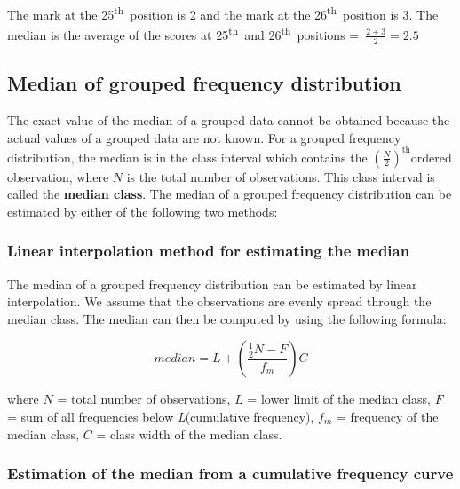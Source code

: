 \documentclass[
]{book}
\begin{document}
The mark at the 25\textsuperscript{th}~position is 2 and the mark at the 26\textsuperscript{th}~position
is 3. The median is the average of the scores at 25\textsuperscript{th}~and
26\textsuperscript{th}~positions =~\(\frac{2 + 3}{2} = 2.5\)

\hypertarget{median-of-grouped-frequency-distribution}{%
\subsection{Median of grouped frequency distribution}\label{median-of-grouped-frequency-distribution}}

The exact value of the median of a grouped data cannot be obtained
because the actual values of a grouped data are not known. For a grouped
frequency distribution, the median is in the class interval which
contains the \(\left( \frac{N}{2} \right)^{\text{th}}\)ordered
observation, where \(N\) is the total number of observations. This class
interval is called the \textbf{median class}. The median of a grouped
frequency distribution can be estimated by either of the following two
methods:

\hypertarget{linear-interpolation-method-for-estimating-the-median}{%
\subsubsection{Linear interpolation method for estimating the median}\label{linear-interpolation-method-for-estimating-the-median}}

The median of a grouped frequency distribution can be estimated by
linear interpolation. We assume that the observations are evenly spread
through the median class. The median can then be computed by using the
following formula:

\[median = L + \left( \frac{\frac{1}{2}N - F}{f_{m}} \right)C\]

where \(N\) = total number of observations, \(L\) = lower limit of the
median class, \(F\) = sum of all frequencies below \emph{L}(cumulative
frequency), \(f_{m}\) = frequency of the median class, \(C\) = class width
of the median class.

\hypertarget{estimation-of-the-median-from-a-cumulative-frequency-curve}{%
\subsubsection{Estimation of the median from a cumulative frequency curve}\label{estimation-of-the-median-from-a-cumulative-frequency-curve}}
\end{document}
